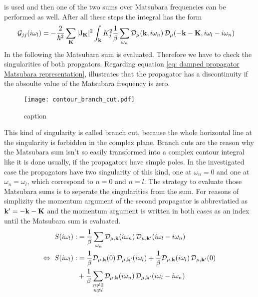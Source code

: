 %
is used and then one of the two sums over Matsubara frequencies can be performed as well.
After all these steps the integral has the form
%
\begin{align}
	\mathcal{G}_{jj}(i\omega_{l}) &= 
		-\frac{2}{\hbar^{2}} 
		\sum\limits_{\vb{K}} 
		\vert \mathrm{J}_{\vb{K}} \vert^{2}
		\int_{\vb{k}} K_{j}^{2}
		\frac{1}{\beta} \sum\limits_{\omega_{n}}
		\mathcal{D}_{\mu}(\vb{k},i\omega_{n}) \,
		\mathcal{D}_{\mu}(-\vb{k}-\vb{K},i\omega_{l}-i\omega_{n})
		\label{eq: Green function on the imaginary axis}
\end{align}
%
In the following the Matsubara sum is evaluated.
Therefore we have to check the singularities of both propgators.
Regarding equation \eqref{eq: damped propagator Matsubara representation}, illustrates that the propagator has a discontinuity if the absoulte value of the Matsubara frequency is zero.
%
\begin{figure}[t]
	\centering
	\texttt{[image: contour\_branch\_cut.pdf]}
	\caption{caption}
	\label{fig: contour branch cut}
\end{figure}
%
This kind of singularity is called branch cut, because the whole horizontal line at the singularity is forbidden in the complex plane.
Branch cuts are the reason why the Matsubara sum isn't so easily transformed into a complex contour integral like it is done usually, if the propagators have simple poles.
In the investigated case the propagators have two singularity of this kind, one at $\omega_{n} = 0$ and one at $\omega_{n} = \omega_{l}$, which correspond to $n=0$ and $n=l$.
The strategy to evaluate those Matsubara sums is to seperate the singularities from the sum.
For reasons of simplizity the momentum argument of the second propagator is abbreviatied as $\vb{k}'=-\vb{k}-\vb{K}$ and the momentum argument is written in both cases as an index until the Matsubara sum is evaluated.
%
\begin{align}
	S(i\omega_{l}) :&= \frac{1}{\beta} \sum\limits_{\omega_{n}} \mathcal{D}_{\mu,\vb{k}}(i\omega_{n}) \, \mathcal{D}_{\mu,\vb{k}'}(i\omega_{l}-i\omega_{n})
	\notag \\
	\Leftrightarrow\ S(i\omega_{l}) :&= 
		\frac{1}{\beta} \mathcal{D}_{\mu,\vb{k}}(0) \, \mathcal{D}_{\mu,\vb{k}'}(i\omega_{l})
		+
		\frac{1}{\beta} \mathcal{D}_{\mu,\vb{k}}(i\omega_{l}) \, \mathcal{D}_{\mu,\vb{k}'}(0)
		\notag \\
		&+
		\frac{1}{\beta} \sum\limits_{\substack{n \neq 0 \\ n \neq l}} \mathcal{D}_{\mu,\vb{k}}(i\omega_{n}) \, \mathcal{D}_{\mu,\vb{k}'}(i\omega_{l}-i\omega_{n})
	\label{eq: seperated Matsubara sum}
\end{align}
